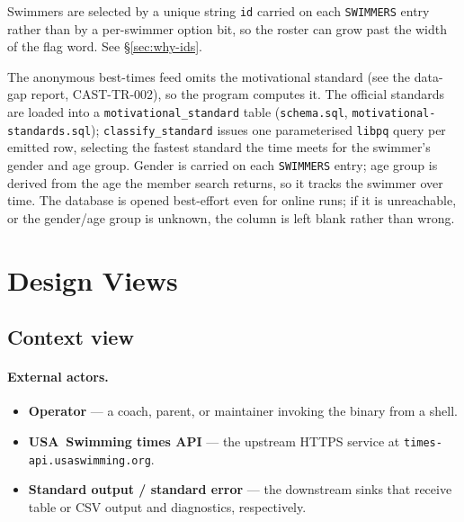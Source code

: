 \documentclass[12pt]{article}
\newcommand{\code}[1]{\texttt{#1}}
\begin{document}
\begin{description}[style=nextline]
  \item[D-7: Id-based swimmer selection.]
        Swimmers are selected by a unique string \code{id} carried
        on each \code{SWIMMERS} entry rather than by a per-swimmer
        option bit, so the roster can grow past the width of the
        flag word.  See \S\ref{sec:why-ids}.

  \item[D-8: Motivational standard computed locally from Postgres.]
        The anonymous best-times feed omits the motivational standard
        (see the data-gap report, CAST-TR-002), so the program computes
        it.  The official standards are loaded into a
        \code{motivational\_standard} table (\code{schema.sql},
        \code{motivational-standards.sql}); \code{classify\_standard}
        issues one parameterised \code{libpq} query per emitted row,
        selecting the fastest standard the time meets for the swimmer's
        gender and age group.  Gender is carried on each \code{SWIMMERS}
        entry; age group is derived from the age the member search
        returns, so it tracks the swimmer over time.  The database is
        opened best-effort even for online runs; if it is unreachable,
        or the gender/age group is unknown, the column is left blank
        rather than wrong.

\section{Design Views}

\subsection{Context view}

\paragraph{External actors.}
\begin{itemize}
  \item \textbf{Operator} --- a coach, parent, or maintainer
        invoking the binary from a shell.
  \item \textbf{USA~Swimming times API} --- the upstream HTTPS
        service at \texttt{times-api.usaswimming.org}.
  \item \textbf{Standard output / standard error} --- the
        downstream sinks that receive table or CSV output and
        diagnostics, respectively.
\end{itemize}


\end{description}
\end{document}
